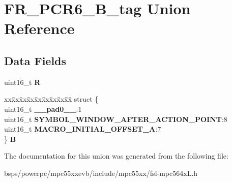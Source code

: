 \hypertarget{unionFR__PCR6__16B__tag}{}\section{F\+R\+\_\+\+P\+C\+R6\+\_\+B\+\_\+tag Union Reference}
\label{unionFR__PCR6__16B__tag}
\subsection*{Data Fields}
\begin{DoxyCompactItemize}
\item 
\mbox{\label{unionFR__PCR6__16B__tag_a66e47a0e9f90f43dac52ceee4a1fef9a}} 
uint16\+\_\+t {\bfseries R}
\item 
\mbox{\label{unionFR__PCR6__16B__tag_a3fbc6f1b8eadb27d7c041660a924b3b5}} 
\begin{tabbing}
xx\=xx\=xx\=xx\=xx\=xx\=xx\=xx\=xx\=\kill
struct \{\\
\>uint16\_t {\bfseries \_\_pad0\_\_}:1\\
\>uint16\_t {\bfseries SYMBOL\_WINDOW\_AFTER\_ACTION\_POINT}:8\\
\>uint16\_t {\bfseries MACRO\_INITIAL\_OFFSET\_A}:7\\
\} {\bfseries B}\\

\end{tabbing}\end{DoxyCompactItemize}


The documentation for this union was generated from the following file\+:\begin{DoxyCompactItemize}
\item 
bsps/powerpc/mpc55xxevb/include/mpc55xx/fsl-\/mpc564x\+L.\+h\end{DoxyCompactItemize}
